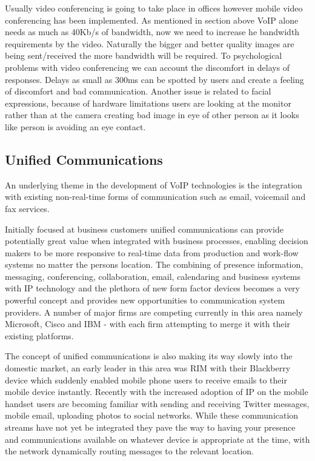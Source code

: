 Usually video conferencing is going to take place in offices however mobile video conferencing has been implemented. As mentioned in section above VoIP alone needs as much as 40Kb/s of bandwidth, now we need to increase he bandwidth requirements by the video. Naturally the bigger and better quality images are being sent/received the more bandwidth will be required.
To psychological problems with video conferencing we can account the discomfort in delays of responses. Delays as small as 300ms can be spotted by users and create a feeling of discomfort and bad communication. Another issue is related to facial expressions, because of hardware limitations users are looking at the monitor rather than at the camera creating bad image in eye of other person as it looks like person is avoiding an eye contact\cite{website:vid_conf_overview}.

\subsection{Unified Communications}

An underlying theme in the development of VoIP technologies is the integration with existing non-real-time forms of communication such as email, voicemail and fax services.

Initially focused at business customers unified communications can provide potentially great value when integrated with business processes, enabling decision makers to be more responsive to real-time data from production and work-flow systems no matter the persons location. The combining of presence information, messaging, conferencing, collaboration, email, calendaring and business systems with IP technology and the plethora of new form factor devices becomes a very powerful concept and provides new opportunities to communication system providers. A number of major firms are competing currently in this area namely Microsoft, Cisco and IBM - with each firm attempting to merge it with their existing platforms.

The concept of unified communications is also making its way slowly into the domestic market, an early leader in this area was RIM with their Blackberry device which suddenly enabled mobile phone users to receive emails to their mobile device instantly. Recently with the increased adoption of IP on the mobile handset users are becoming familiar with sending and receiving Twitter messages, mobile email, uploading photos to social networks. While these communication streams have not yet be integrated they pave the way to having your presence and communications available on whatever device is appropriate at the time, with the network dynamically routing messages to the relevant location.

